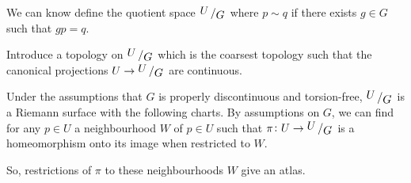 \documentclass[11pt,a4paper]{article}
\begin{document}
We can know define the quotient space $\bigslant{U}{G}$ where
$p \sim q$ if there exists $g \in G$ such that $gp = q$.

Introduce a topology on $\bigslant{U}{G}$ which is the coarsest topology
such that the canonical projections $U \to \bigslant{U}{G}$ are continuous.

Under the assumptions that $G$ is properly discontinuous and torsion-free,
$\bigslant{U}{G}$ is a Riemann surface with the following charts.
By assumptions on $G$, we can find for any $p \in U$ a neighbourhood $W$ of
$p \in U$ such that $\pi \colon U \to \bigslant{U}{G}$ is a homeomorphism
onto its image when restricted to $W$.

So, restrictions of $\pi$ to these neighbourhoods $W$ give an atlas.
\end{document}
